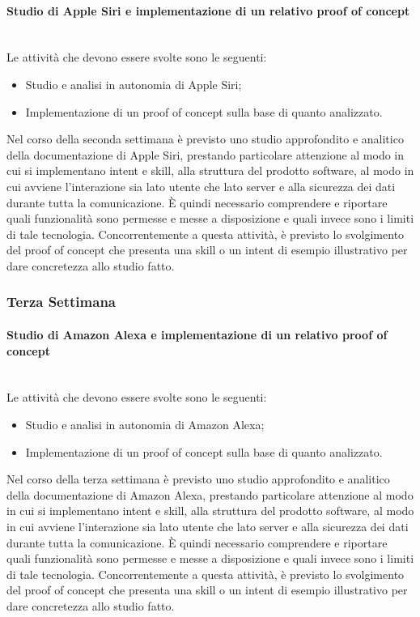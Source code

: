 {    	\paragraph*{Studio di Apple Siri e implementazione di un relativo proof of concept} \mbox{}\\ [1mm]
    	Le attività che devono essere svolte sono le seguenti:
        \begin{itemize}
            \item Studio e analisi in autonomia di Apple Siri;
            \item Implementazione di un proof of concept sulla base di quanto analizzato.
        \end{itemize}
	    Nel corso della seconda settimana è previsto uno studio approfondito e analitico della documentazione di Apple Siri, prestando particolare attenzione al modo in cui si implementano intent e skill, alla struttura del prodotto software, al modo in cui avviene l'interazione sia lato utente che lato server e alla sicurezza dei dati durante tutta la comunicazione. È quindi necessario comprendere e riportare quali funzionalità sono permesse e messe a disposizione e quali invece sono i limiti di tale tecnologia.
	    Concorrentemente a questa attività, è previsto lo svolgimento del proof of concept che presenta una skill o un intent di esempio illustrativo per dare concretezza allo studio fatto.
	\subsubsection{Terza Settimana}
		\paragraph*{Studio di Amazon Alexa e implementazione di un relativo proof of concept} \mbox{}\\ [1mm]
	   	Le attività che devono essere svolte sono le seguenti:
        \begin{itemize}
            \item Studio e analisi in autonomia di Amazon Alexa;
            \item Implementazione di un proof of concept sulla base di quanto analizzato.
        \end{itemize}
	    Nel corso della terza settimana è previsto uno studio approfondito e analitico della documentazione di Amazon Alexa, prestando particolare attenzione al modo in cui si implementano intent e skill, alla struttura del prodotto software, al modo in cui avviene l'interazione sia lato utente che lato server e alla sicurezza dei dati durante tutta la comunicazione. È quindi necessario comprendere e riportare quali funzionalità sono permesse e messe a disposizione e quali invece sono i limiti di tale tecnologia.
	    Concorrentemente a questa attività, è previsto lo svolgimento del proof of concept che presenta una skill o un intent di esempio illustrativo per dare concretezza allo studio fatto.
}
